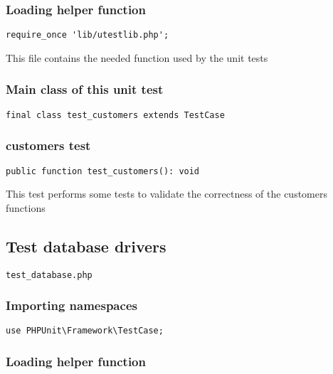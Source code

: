 \documentclass[a4paper]{article}
\begin{document}
\subsubsection{Loading helper function}

\begin{lstlisting}
require_once 'lib/utestlib.php';
\end{lstlisting}

This file contains the needed function used by the unit tests

\hypertarget{toc115}{}
\subsubsection{Main class of this unit test}

\begin{lstlisting}
final class test_customers extends TestCase
\end{lstlisting}

\hypertarget{toc116}{}
\subsubsection{customers test}

\begin{lstlisting}
public function test_customers(): void
\end{lstlisting}

This test performs some tests to validate the correctness
of the customers functions

\hypertarget{toc117}{}
\subsection{Test database drivers}

\begin{lstlisting}
test_database.php
\end{lstlisting}

\hypertarget{toc118}{}
\subsubsection{Importing namespaces}

\begin{lstlisting}
use PHPUnit\Framework\TestCase;
\end{lstlisting}

\hypertarget{toc119}{}
\subsubsection{Loading helper function}
\end{document}
